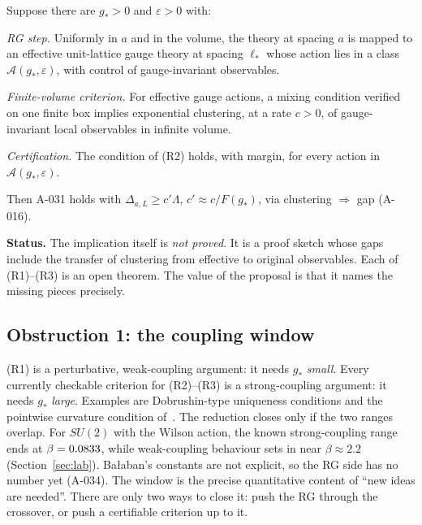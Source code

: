 \documentclass[11pt,a4paper]{article}
\newcommand{\idref}[1]{\textsf{#1}}
\begin{document}
\begin{proposal}[Reduction; recorded as \idref{A-039}, \statusbadge{OPEN}]\label{prop:reduction}
Suppose there are $g_*>0$ and $\varepsilon>0$ with:
\begin{description}[font=\normalfont\sffamily,leftmargin=1.5cm,labelwidth=1.3cm,align=left]
\item[(R1) \idref{A-034}] \emph{RG step.} Uniformly in $a$ and in the volume, the theory at spacing $a$ is mapped to an effective unit-lattice gauge theory at spacing $\ell_*$ whose action lies in a class $\mathcal A(g_*,\varepsilon)$, with control of gauge-invariant observables.
\item[(R2) \idref{A-035}] \emph{Finite-volume criterion.} For effective gauge actions, a mixing condition verified on one finite box implies exponential clustering, at a rate $c>0$, of gauge-invariant local observables in infinite volume.
\item[(R3) \idref{A-036}] \emph{Certification.} The condition of (R2) holds, with margin, for every action in $\mathcal A(g_*,\varepsilon)$.
\end{description}
Then \idref{A-031} holds with $\Delta_{a,L}\ge c'\Lambda$, $c'\approx c/F(g_*)$, via clustering $\Rightarrow$ gap (\idref{A-016}).
\end{proposal}

\textbf{Status.} The implication itself is \emph{not proved}. It is a proof sketch whose gaps include the transfer of clustering from effective to original observables. Each of (R1)--(R3) is an open theorem. The value of the proposal is that it names the missing pieces precisely.

\subsection{Obstruction 1: the coupling window}
(R1) is a perturbative, weak-coupling argument: it needs $g_*$ \emph{small}. Every currently checkable criterion for (R2)--(R3) is a strong-coupling argument: it needs $g_*$ \emph{large}. Examples are Dobrushin-type uniqueness conditions and the pointwise curvature condition of~\cite{SZZ23}. The reduction closes only if the two ranges overlap. For $SU(2)$ with the Wilson action, the known strong-coupling range ends at $\beta=0.0833$, while weak-coupling behaviour sets in near $\beta\approx2.2$ (Section~\ref{sec:lab}). Ba{\l}aban's constants are not explicit, so the RG side has no number yet (\idref{A-034}). The window is the precise quantitative content of \enquote{new ideas are needed}. There are only two ways to close it: push the RG through the crossover, or push a certifiable criterion up to it.
\end{document}
